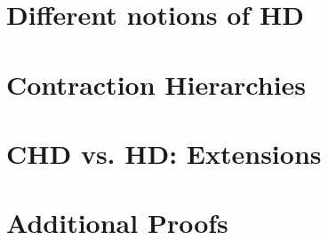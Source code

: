 \documentclass{article}
\theoremstyle{plain}
\theoremstyle{definition}
\begin{document}
\begin{comment}
\subsubsection{Using the size of the Pareto Frontier}


\subsection{Comparing HD and CHD}
\label{ssec:hdvschd}


\section{Scalable CSP Algorithms: \texorpdfstring{\\}{ } Practical Implementation}
\label{sec:numeric}




\end{comment}


\appendix
\section{Different notions of HD}
\label{app:generalhd}


\section{Contraction Hierarchies}


\section{CHD vs. HD: Extensions}
\label{app:extn}



\section{Additional Proofs}
\label{sec:proofs}

\end{document}
